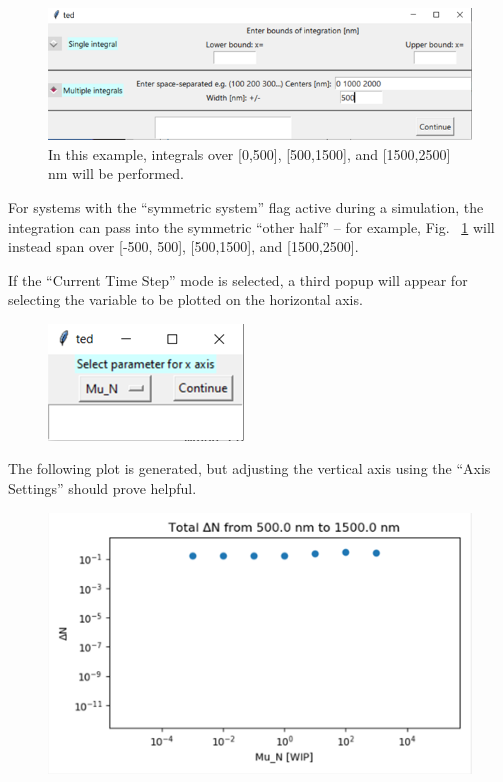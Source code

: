 \documentclass[11pt,letterpaper,titlepage]{article}
\begin{document}
		\begin{figure}[H]
			\label{fig:integration_getbounds_example}
			\centering
			\includegraphics{"integration_getbounds_example"}
			\caption{In this example, integrals over [0,500], [500,1500], and [1500,2500] nm will be performed.}
			
		\end{figure}
		
		\par For systems with the “symmetric system” flag active during a simulation, the integration can pass into the symmetric “other half” – for example, Fig. ~\ref{fig:integration_getbounds_example} will instead span over [-500, 500], [500,1500], and [1500,2500].
		
		\par If the “Current Time Step” mode is selected, a third popup will appear for selecting the variable to be plotted on the horizontal axis.
		
		\begin{figure}[H]
			\label{fig:integration_xaxis_example}
			\centering
			\includegraphics{"integration_xaxis_example"}
		\end{figure}
	
		\par The following plot is generated, but adjusting the vertical axis using the “Axis Settings” should prove helpful.
		
		\begin{figure}[H]
			\label{fig:integration_result}
			\centering
			\includegraphics{"integration_result"}
		\end{figure}
	
\end{document}
